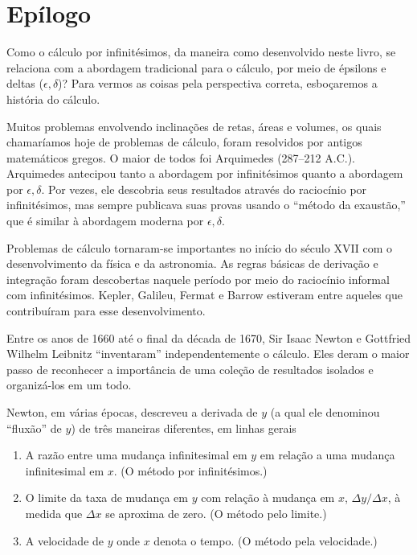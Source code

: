 \graphicspath{ {./figuras/epilogo/} }
\chapter*{Epílogo}

\setcounter{chapter}{5}%
\renewcommand{\thechapter}{\Alph{chapter}}%
\renewcommand{\thefigure}{\thechapter.\arabic{figure}}


Como o cálculo por infinitésimos, da maneira como desenvolvido neste livro,
se relaciona com a abordagem tradicional para o cálculo, por meio de
épsilons e deltas ($\epsilon,\delta$)?
Para vermos as coisas pela perspectiva correta,
esboçaremos a história do cálculo.

Muitos problemas envolvendo inclinações de retas, áreas e volumes, os quais
chamaríamos hoje de problemas de cálculo, foram resolvidos por antigos
matemáticos gregos. O maior de todos foi Arquimedes (287--212 A.C.).
Arquimedes antecipou tanto a abordagem por infinitésimos quanto a
abordagem por $\epsilon,\delta$. Por vezes, ele descobria seus resultados
através do raciocínio por infinitésimos, mas sempre publicava suas provas
usando o ``método da exaustão,'' que é similar à abordagem moderna por
$\epsilon,\delta$.

Problemas de cálculo tornaram-se importantes no início do século
XVII com o desenvolvimento da física e da astronomia. As regras
básicas de derivação e integração foram descobertas naquele período
por meio do raciocínio informal com infinitésimos. Kepler, Galileu,
Fermat e Barrow estiveram entre aqueles que contribuíram para esse
desenvolvimento.

Entre os anos de 1660 até o final da década de 1670, Sir Isaac Newton e
Gottfried Wilhelm Leibnitz ``inventaram'' independentemente o cálculo.
Eles deram o maior passo de reconhecer a importância de uma coleção
de resultados isolados e organizá-los em um todo.

Newton, em várias épocas, descreveu a derivada de $y$ (a qual ele
denominou ``fluxão'' de $y$) de
três maneiras diferentes, em linhas gerais
\begin{enumerate}[(1)]
\item A razão entre uma mudança infinitesimal em $y$ em relação a
      uma mudança infinitesimal em $x$. (O método por infinitésimos.)
\item O limite da taxa de mudança em $y$ com relação à mudança em $x$,
      $\Delta y / \Delta x$, à medida que $\Delta x$ se aproxima de
      zero. (O método pelo limite.)
\item A velocidade de $y$ onde $x$ denota o tempo. (O método pela
      velocidade.)
\end{enumerate}

